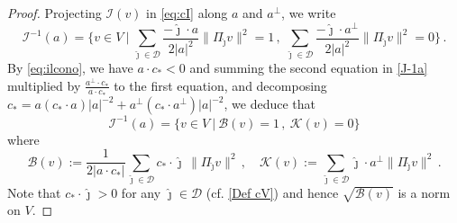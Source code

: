 \documentclass[10pt,a4paper]{amsart}
\newcommand{\cB}{{\mathcal B}}
\newcommand{\cD}{{\mathcal D}}
\newcommand{\cI}{{\mathcal I}}
\newcommand{\cK}{{\mathcal K}}
\begin{document}
        \begin{proof} 
       
    Projecting  $ \cI (v) $ in \eqref{eq:cI}  
       along  $ a $ and 
       $ a^\bot $, 
    we write
    \begin{equation}
    \label{J-1a}
    \cI^{-1} (a) 
    = \Big\{ v\in V \ | \
    \sum_{\hat \jmath\in \cD}\frac{-\hat \jmath \cdot a}{2|a|^2}\|\Pi_{\hat \jmath}v\|^2=1 \, ,  \ \sum_{\hat \jmath\in \cD}\frac{-\hat \jmath \cdot a^\bot}{2|a|^2}\|\Pi_{\hat \jmath}v\|^2=0 
    \Big\} \, . 
\end{equation}
By \eqref{eq:ilcono}, 
we have $a\cdot c_*<0 $ and
 summing the second equation in \eqref{J-1a} multiplied by $\frac{ a^\bot\cdot c_*}{a\cdot c_*}$ to the first equation, 
 and decomposing  $  c_* = 
a (c_* \cdot a)|a|^{-2} + a^\bot 
(c_* \cdot a^\bot) |a|^{-2} $, we deduce that 
\begin{equation}\label{J-2a}
  \cI^{-1} (a)  = \Big\{ v\in V \ | \
    \cB(v)=1 \, ,  \ \cK(v)=0 
    \Big\}
    \end{equation}
    where
     \begin{equation}\label{cBcK}
            \cB(v):=\frac{1}{2|a\cdot c_*|}\sum_{\hat \jmath\in \cD} c_*\cdot \hat \jmath \, \|\Pi_{\hat \jmath} v\|^2 \, , \quad 
            \cK(v):=\sum_{\hat \jmath \in \cD} \hat \jmath \cdot a^\bot \|\Pi_{\hat \jmath} v\|^2\, .
    \end{equation}
    Note that $c_*\cdot \hat \jmath  >0$ for any $ \hat \jmath \in \cD$ (cf. \eqref{Def cV}) and hence $ \sqrt{\cB(v)}$ is a norm on $ V $. 


\end{proof}
\end{document}
